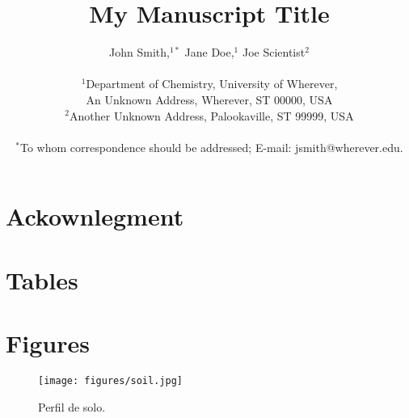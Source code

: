 \documentclass[12pt]{article}
\title{My Manuscript Title}
\author
{John Smith,$^{1\ast}$ Jane Doe,$^{1}$ Joe Scientist$^{2}$\\
\\
\normalsize{$^{1}$Department of Chemistry, University of Wherever,}\\
\normalsize{An Unknown Address, Wherever, ST 00000, USA}\\
\normalsize{$^{2}$Another Unknown Address, Palookaville, ST 99999, USA}\\
\\
\normalsize{$^\ast$To whom correspondence should be addressed; E-mail:  jsmith@wherever.edu.}
}
\date{}
\begin{document}

  \linenumbers
  \setlength\linenumbersep{15pt}
  \renewcommand\linenumberfont{\normalfont\footnotesize\sffamily\color{gray}}
  \modulolinenumbers[1] %


\baselineskip24pt


\maketitle









\section*{Ackownlegment}

\newpage



\newpage
\section*{Tables}
% 



\newpage
\section*{Figures}

\begin{figure}[h]
	\centering %
	\texttt{[image: figures/soil.jpg]} %
	\caption{Perfil de solo.}
	\label{fig1}
\end{figure}
\end{document}
